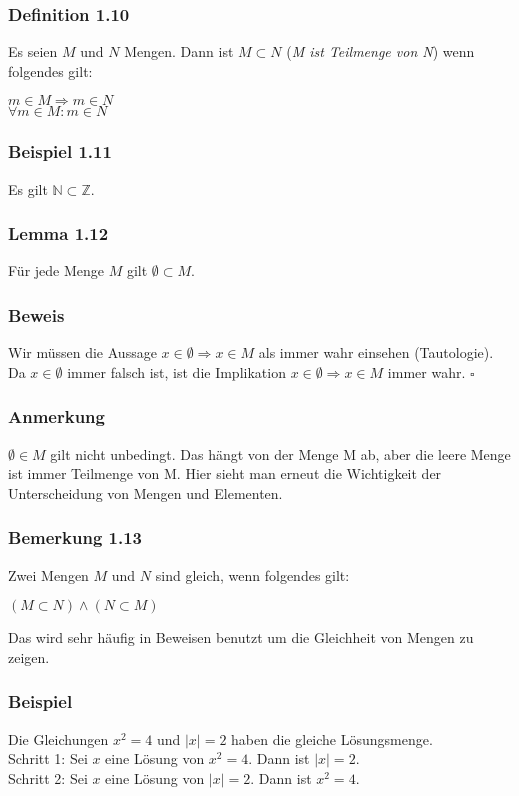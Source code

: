 \documentclass{article}
\begin{document}
\subsubsection*{Definition 1.10}
Es seien $M$ und $N$ Mengen. Dann ist $M \subset N$ (\textit{M ist Teilmenge von N}) wenn folgendes gilt: 

\begin{center}
    $m \in M \Rightarrow m \in N$ \\
    $\forall m \in M: m \in N$
\end{center}

\subsubsection*{Beispiel 1.11}
Es gilt $\mathbb{N} \subset \mathbb{Z}$. 

\subsubsection*{Lemma 1.12}
Für jede Menge $M$ gilt $\emptyset \subset M$. 

\subsubsection*{Beweis}
Wir müssen die Aussage $x \in \emptyset \Rightarrow x \in M$ als immer wahr einsehen (Tautologie). 
Da $x \in \emptyset$ immer falsch ist, ist die Implikation $x \in \emptyset \Rightarrow x \in M$ immer wahr. $\square$ 

\subsubsection*{Anmerkung}
$\emptyset \in M$ gilt nicht unbedingt. Das hängt von der Menge M ab, aber die leere Menge ist immer Teilmenge von M. Hier sieht man erneut die Wichtigkeit der Unterscheidung von Mengen und Elementen. 

\subsubsection*{Bemerkung 1.13}
Zwei Mengen $M$ und $N$ sind gleich, wenn folgendes gilt: 
\begin{center}
    $(M \subset N) \wedge (N \subset M)$
\end{center}
Das wird sehr häufig in Beweisen benutzt um die Gleichheit von Mengen zu zeigen. 

\subsubsection*{Beispiel}
Die Gleichungen $x^2 = 4$ und $|x| = 2$ haben die gleiche Lösungsmenge. \\
Schritt 1: Sei $x$ eine Lösung von $x^2 = 4$. Dann ist $|x| = 2$. \\
Schritt 2: Sei $x$ eine Lösung von $|x| = 2$. Dann ist $x^2 = 4$. 
\end{document}
